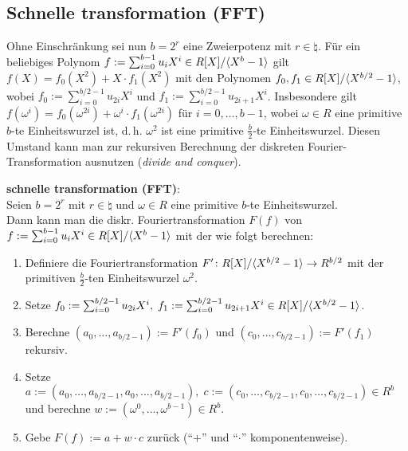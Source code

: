 \pagebreak

\subsection{%
    Schnelle transformation (FFT)%
}

Ohne Einschränkung sei nun $b = 2^r$ eine Zweierpotenz mit $r \in \natural$.
Für ein beliebiges Polynom $f := \sum_{i=0}^{b-1} u_i X^i \in R[X]/\langle X^b - 1\rangle$ gilt
$f(X) = f_0(X^2) + X \cdot f_1(X^2)$ mit den Polynomen
$f_0, f_1 \in R[X]/\langle X^{b/2} - 1\rangle$,
wobei $f_0 := \sum_{i=0}^{b/2-1} u_{2i} X^i$ und
$f_1 := \sum_{i=0}^{b/2-1} u_{2i+1} X^i$.
Insbesondere gilt $f(\omega^i) = f_0(\omega^{2i}) + \omega^i \cdot f_1(\omega^{2i})$
für $i = 0, \dotsc, b - 1$,
wobei $\omega \in R$ eine primitive $b$-te Einheitswurzel ist,
d.\,h. $\omega^2$ ist eine primitive $\frac{b}{2}$-te Einheitswurzel.
Diesen Umstand kann man zur rekursiven Berechnung der diskreten Fourier-Transformation ausnutzen
(\emph{divide and conquer}).

\textbf{schnelle transformation (FFT)}:\\
Seien $b = 2^r$ mit $r \in \natural$ und $\omega \in R$ eine primitive $b$-te Einheitswurzel.\\
Dann kann man die diskr. Fouriertransformation $F(f)$ von
$f := \sum_{i=0}^{b-1} u_i X^i \in R[X]/\langle X^b - 1\rangle$
mit der  wie folgt berechnen:
\begin{enumerate}
    \item
    Definiere die Fouriertransformation $F'\colon R[X]/\langle X^{b/2} - 1\rangle \to R^{b/2}$
    mit der primitiven $\frac{b}{2}$-ten Einheitswurzel $\omega^2$.
    
    \item
    Setze
    $f_0 := \sum_{i=0}^{b/2-1} u_{2i} X^i,\;
    f_1 := \sum_{i=0}^{b/2-1} u_{2i+1} X^i \in R[X]/\langle X^{b/2} - 1\rangle$.
    
    \item
    Berechne $(a_0, \dotsc, a_{b/2-1}) := F'(f_0)$ und
    $(c_0, \dotsc, c_{b/2-1}) := F'(f_1)$ rekursiv.
    
    \item
    Setze $a := (a_0, \dotsc, a_{b/2-1}, a_0, \dotsc, a_{b/2-1}),\;
    c := (c_0, \dotsc, c_{b/2-1}, c_0, \dotsc, c_{b/2-1}) \in R^b$ und berechne
    $w := (\omega^0, \dotsc, \omega^{b-1}) \in R^b$.
    
    \item
    Gebe $F(f) := a + w \cdot c$ zurück ("`$+$"' und "`$\cdot$"' komponentenweise).
\end{enumerate}

